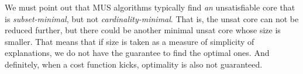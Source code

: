 


% 
% 


We must point out that MUS algorithms typically find \textit{an} unsatisfiable core that is \textit{subset-minimal}, but not \textit{cardinality-minimal}. That is, the unsat core can not be reduced further, but there could be another minimal unsat core whose size is smaller.
That means that if size is taken as a measure of simplicity of explanations, we do not have the guarantee to find the optimal ones. And definitely, when a cost function kicks, optimality is also not guaranteed. 
% 

